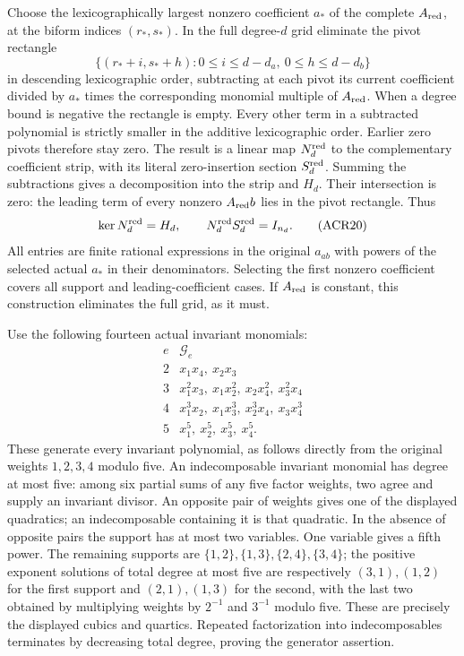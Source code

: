 \documentclass[11pt,a4paper]{article}
\begin{document}
Choose the lexicographically largest nonzero coefficient
$a_*$ of the complete $A_{\rm red}$, at the biform
indices $(r_*,s_*)$. In the full degree-$d$ grid eliminate
the pivot rectangle
\[
 \{(r_*+i,s_*+h):0\leq i\leq d-d_a,
                             \ 0\leq h\leq d-d_b\}
 \tag{ACR19}
\]
in descending lexicographic order, subtracting at each
pivot its current coefficient divided by $a_*$ times
the corresponding monomial multiple of $A_{\rm red}$.
When a degree bound is negative the rectangle is empty.
Every other term in a subtracted polynomial is strictly
smaller in the additive lexicographic order. Earlier zero
pivots therefore stay zero. The result is a linear map
$N_d^{\rm red}$ to the complementary coefficient strip,
with its literal zero-insertion section $S_d^{\rm red}$.
Summing the subtractions gives a decomposition into the
strip and $H_d$. Their intersection is zero: the leading
term of every nonzero $A_{\rm red}b$ lies in the pivot
rectangle. Thus
\[
 \ker N_d^{\rm red}=H_d,\qquad
 N_d^{\rm red}S_d^{\rm red}=I_{n_d}.
 \tag{ACR20}
\]
All entries are finite rational expressions in the original
$a_{ab}$ with powers of the selected actual $a_*$ in their
denominators. Selecting the first nonzero coefficient covers
all support and leading-coefficient cases. If $A_{\rm red}$
is constant, this construction eliminates the full grid,
as it must.

Use the following fourteen actual invariant monomials:
\[
 \begin{array}{c|l}
 e&\mathcal G_e\\\hline
 2&x_1x_4,\ x_2x_3\\
 3&x_1^2x_3,\ x_1x_2^2,\ x_2x_4^2,\ x_3^2x_4\\
 4&x_1^3x_2,\ x_1x_3^3,\ x_2^3x_4,\ x_3x_4^3\\
 5&x_1^5,\ x_2^5,\ x_3^5,\ x_4^5.
 \end{array}\tag{ACR21}
\]
These generate every invariant polynomial, as follows
directly from the original weights $1,2,3,4$ modulo five.
An indecomposable invariant monomial has degree at most
five: among six partial sums of any five factor weights,
two agree and supply an invariant divisor. An opposite
pair of weights gives one of the displayed quadratics;
an indecomposable containing it is that quadratic. In the
absence of opposite pairs the support has at most two
variables. One variable gives a fifth power. The remaining
supports are $\{1,2\},\{1,3\},\{2,4\},\{3,4\}$;
the positive exponent solutions of total degree at most
five are respectively $(3,1),(1,2)$ for the first support
and $(2,1),(1,3)$ for the second, with the last two obtained
by multiplying weights by $2^{-1}$ and $3^{-1}$ modulo
five. These are precisely the displayed cubics and quartics.
Repeated factorization into indecomposables terminates by
decreasing total degree, proving the generator assertion.
\end{document}
